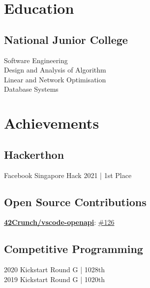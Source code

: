 \documentclass[]{Klement_Resume}
\begin{document}
\begin{minipage}[t]{0.33\textwidth} 


\section{Education} 

\sectionsep

\subsection{National Junior College}
\sectionsep
{}
Software Engineering \\
Design and Analysis of Algorithm \\
Linear and Network Optimisation \\
Database Systems\\






\section{Achievements}
\subsection{Hackerthon}
Facebook Singapore Hack 2021 | 1st Place
\subsection{Open Source Contributions}
\href{https://github.com/42Crunch/vscode-openapi}{\bf 42Crunch/vscode-openapi}: \href{https://github.com/42Crunch/vscode-openapi/pull/126}{\#126}
\sectionsep
\subsection{Competitive Programming}
2020 Kickstart Round G | 1028th \\
2019 Kickstart Round G | 1020th\\
\sectionsep



\end{minipage}
\end{document}
